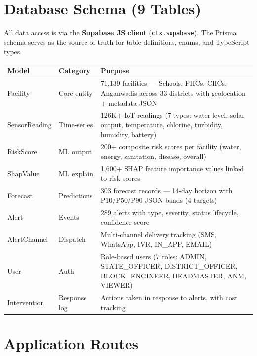 \documentclass[12pt,a4paper]{report}
\begin{document}
\section{Database Schema (9 Tables)}

All data access is via the \textbf{Supabase JS client} (\texttt{ctx.supabase}). The Prisma schema serves as the source of truth for table definitions, enums, and TypeScript types.

\begin{tabularx}{\textwidth}{llX}
\toprule
\textbf{Model} & \textbf{Category} & \textbf{Purpose} \\
\midrule
Facility       & Core entity   & 71,139 facilities --- Schools, PHCs, CHCs, Anganwadis across 33 districts with geolocation + metadata JSON \\
SensorReading  & Time-series   & 126K+ IoT readings (7 types: water level, solar output, temperature, chlorine, turbidity, humidity, battery) \\
RiskScore      & ML output     & 200+ composite risk scores per facility (water, energy, sanitation, disease, overall) \\
ShapValue      & ML explain    & 1,600+ SHAP feature importance values linked to risk scores \\
Forecast       & Predictions   & 303 forecast records --- 14-day horizon with P10/P50/P90 JSON bands (4 targets) \\
Alert          & Events        & 289 alerts with type, severity, status lifecycle, confidence score \\
AlertChannel   & Dispatch      & Multi-channel delivery tracking (SMS, WhatsApp, IVR, IN\_APP, EMAIL) \\
User           & Auth          & Role-based users (7 roles: ADMIN, STATE\_OFFICER, DISTRICT\_OFFICER, BLOCK\_ENGINEER, HEADMASTER, ANM, VIEWER) \\
Intervention   & Response log  & Actions taken in response to alerts, with cost tracking \\
\bottomrule
\end{tabularx}

\section{Application Routes}
\end{document}
